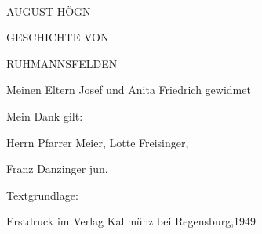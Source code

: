 





























AUGUST HÖGN



GESCHICHTE VON

RUHMANNSFELDEN

Meinen Eltern Josef und Anita Friedrich gewidmet

































































Mein Dank gilt:

Herrn Pfarrer Meier, Lotte Freisinger,

Franz Danzinger jun.



Textgrundlage:

Erstdruck im Verlag Kallmünz bei Regensburg,1949



